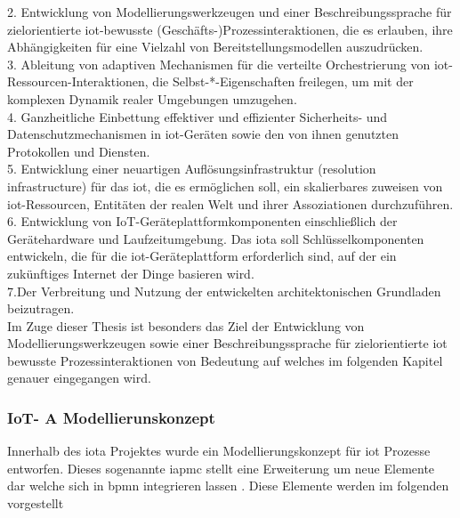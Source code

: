 \documentclass[a4paper, 12pt, twoside, headsepline=true]{scrartcl} %
\begin{document}
2. Entwicklung von Modellierungswerkzeugen und einer Beschreibungssprache für zielorientierte \ac{iot}-bewusste (Geschäfts-)Prozessinteraktionen, die es erlauben, ihre Abhängigkeiten für eine Vielzahl von Bereitstellungsmodellen auszudrücken.
\\

3. Ableitung von adaptiven Mechanismen für die verteilte Orchestrierung von \ac{iot}-Ressourcen-Interaktionen, die Selbst-*-Eigenschaften freilegen, um mit der komplexen Dynamik realer Umgebungen umzugehen. 
\\

4. Ganzheitliche Einbettung effektiver und effizienter Sicherheits- und Datenschutzmechanismen in \ac{iot}-Geräten sowie den von ihnen genutzten Protokollen und Diensten.
\\

5. Entwicklung einer neuartigen Auflösungsinfrastruktur (resolution infrastructure) für das \ac{iot}, die es ermöglichen soll, ein skalierbares zuweisen von \ac{iot}-Ressourcen, Entitäten der realen Welt und ihrer Assoziationen durchzuführen.
\\

6. Entwicklung von IoT-Geräteplattformkomponenten einschließlich der Gerätehardware und Laufzeitumgebung. Das \ac{iota} soll Schlüsselkomponenten entwickeln, die für die \ac{iot}-Geräteplattform erforderlich sind, auf der ein zukünftiges Internet der Dinge basieren wird. 
\\

7.Der Verbreitung und Nutzung der entwickelten architektonischen Grundladen beizutragen.
\\

Im Zuge dieser Thesis ist besonders das Ziel der Entwicklung von Modellierungswerkzeugen sowie einer Beschreibungssprache für zielorientierte \ac{iot} bewusste Prozessinteraktionen von Bedeutung auf welches im folgenden Kapitel genauer eingegangen wird. 

\subsubsection{IoT- A Modellierunskonzept}
Innerhalb des \ac{iota} Projektes wurde ein Modellierungskonzept für \ac{iot} Prozesse entworfen. Dieses sogenannte \ac{iapmc} stellt eine Erweiterung um neue Elemente dar welche sich in \ac{bpmn} integrieren lassen  \cite{conceptsiotawarepm}. Diese Elemente werden im folgenden vorgestellt
\newline
\end{document}
